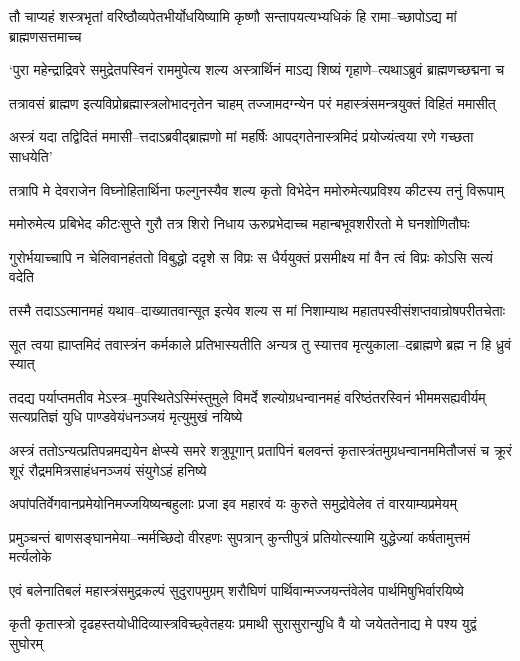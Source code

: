 \twolineshloka
{तौ चाप्यहं शस्त्रभृतां वरिष्ठौव्यपेतभीर्योधयिष्यामि कृष्णौ}
{सन्तापयत्यभ्यधिकं हि रामा--च्छापोऽद्य मां ब्राह्मणसत्तमाच्च}


\twolineshloka
{`पुरा महेन्द्राद्रिवरे समुद्रेतपस्विनं राममुपेत्य शल्य}
{अस्त्रार्थिनं माऽद्य शिष्यं गृहाणे--त्यथाऽब्रुवं ब्राह्मणच्छद्मना च}


\twolineshloka
{तत्रावसं ब्राह्मण इत्यविप्रोब्रह्मास्त्रलोभादनृतेन चाहम्}
{तज्जामदग्न्येन परं महास्त्रंसमन्त्रयुक्तं विहितं ममासीत्}


\twolineshloka
{अस्त्रं यदा तद्विदितं ममासी--त्तदाऽब्रवीद्ब्राह्मणो मां महर्षिः}
{आपद्गतेनास्त्रमिदं प्रयोज्यंत्वया रणे गच्छता साधयेति'}


\twolineshloka
{तत्रापि मे देवराजेन विघ्नोहितार्थिना फल्गुनस्यैव शल्य}
{कृतो विभेदेन ममोरुमेत्यप्रविश्य कीटस्य तनुं विरूपाम्}


\twolineshloka
{ममोरुमेत्य प्रबिभेद कीटःसुप्ते गुरौ तत्र शिरो निधाय}
{ऊरुप्रभेदाच्च महान्बभूवशरीरतो मे घनशोणितौघः}


\twolineshloka
{गुरोर्भयाच्चापि न चेलिवानहंततो विबुद्धो ददृशे स विप्रः}
{स धैर्ययुक्तं प्रसमीक्ष्य मां वैन त्वं विप्रः कोऽसि सत्यं वदेति}


\twolineshloka
{तस्मै तदाऽऽत्मानमहं यथाव--दाख्यातवान्सूत इत्येव शल्य}
{स मां निशाम्याथ महातपस्वीसंशप्तवान्रोषपरीतचेताः}


\twolineshloka
{सूत त्वया ह्याप्तमिदं तवास्त्रंन कर्मकाले प्रतिभास्यतीति}
{अन्यत्र तु स्यात्तव मृत्युकाला--दब्राह्मणे ब्रह्म न हि ध्रुवं स्यात्}


तदद्य पर्याप्तमतीव मेऽस्त्र--मुपस्थितेऽस्मिंस्तुमुले विमर्दे
\twolineshloka
{शल्योग्रधन्वानमहं वरिष्ठंतरस्विनं भीममसह्यवीर्यम्}
{सत्यप्रतिज्ञं युधि पाण्डवेयंधनञ्जयं मृत्युमुखं नयिष्ये}


\threelineshloka
{अस्त्रं ततोऽन्यत्प्रतिपन्नमद्ययेन क्षेप्स्ये समरे शत्रुपूगान्}
{प्रतापिनं बलवन्तं कृतास्त्रंतमुग्रधन्वानममितौजसं च}
{क्रूरं शूरं रौद्रममित्रसाहंधनञ्जयं संयुगेऽहं हनिष्ये}


\twolineshloka
{अपांपतिर्वेगवानप्रमेयोनिमज्जयिष्यन्बहुलाः प्रजा इव}
{महारवं यः कुरुते समुद्रोवेलेव तं वारयाम्यप्रमेयम्}


\twolineshloka
{प्रमुञ्चन्तं बाणसङ्घानमेया--न्मर्मच्छिदो वीरहणः सुपत्रान्}
{कुन्तीपुत्रं प्रतियोत्स्यामि युद्धेज्यां कर्षतामुत्तमं मर्त्यलोके}


\twolineshloka
{एवं बलेनातिबलं महास्त्रंसमुद्रकल्पं सुदुरापमुग्रम्}
{शरौघिणं पार्थिवान्मज्जयन्तंवेलेव पार्थमिषुभिर्वारयिष्ये}


\twolineshloka
{कृती कृतास्त्रो दृढहस्तयोधीदिव्यास्त्रविच्छ्वेतहयः प्रमाथी}
{सुरासुरान्युधि वै यो जयेततेनाद्य मे पश्य युद्वं सुघोरम्}


